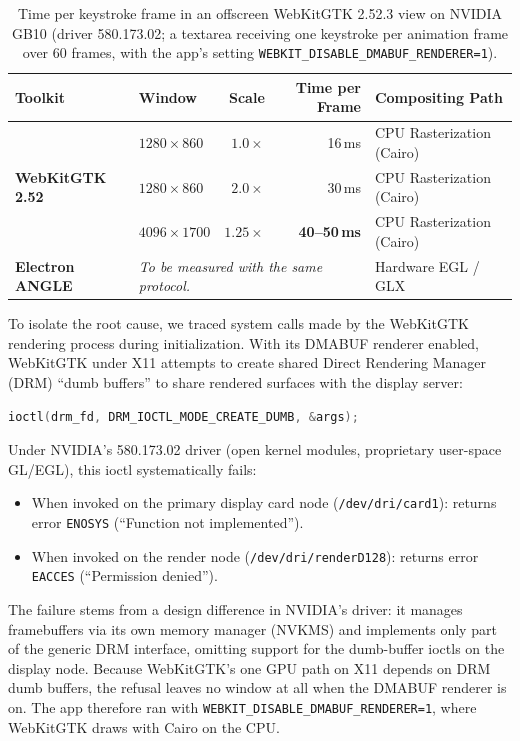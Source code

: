 \documentclass[11pt]{article}
\newcommand{\code}[1]{\texttt{#1}}
\begin{document}
\begin{table}[t]
\centering
\small
\caption{Time per keystroke frame in an offscreen WebKitGTK 2.52.3 view on NVIDIA GB10 (driver 580.173.02; a textarea
receiving one keystroke per animation frame over 60 frames, with the app's setting \code{WEBKIT\_DISABLE\_DMABUF\_RENDERER=1}).}
\label{tab:keystroke-benchmarks}
\begin{tabularx}{\linewidth}{llrrX}
\toprule
\textbf{Toolkit} & \textbf{Window} & \textbf{Scale} & \textbf{Time per Frame} & \textbf{Compositing Path} \\
\midrule
\multirow{3}{*}{\textbf{WebKitGTK 2.52}}
  & $1280 \times 860$   & $1.0\times$  & 16\,ms & CPU Rasterization (Cairo) \\
  & $1280 \times 860$   & $2.0\times$  & 30\,ms & CPU Rasterization (Cairo) \\
  & $4096 \times 1700$  & $1.25\times$ & \textbf{40--50\,ms} & CPU Rasterization (Cairo) \\
\midrule
\textbf{Electron ANGLE} & \multicolumn{3}{l}{\textit{To be measured with the same protocol.}} & Hardware EGL / GLX \\
\bottomrule
\end{tabularx}
\end{table}

To isolate the root cause, we traced system calls made by the WebKitGTK rendering process during initialization.
With its DMABUF renderer enabled, WebKitGTK under X11 attempts to create shared Direct Rendering Manager (DRM)
``dumb buffers'' to share rendered surfaces with the display server:
\begin{lstlisting}[language=c]
ioctl(drm_fd, DRM_IOCTL_MODE_CREATE_DUMB, &args);
\end{lstlisting}
Under NVIDIA's 580.173.02 driver (open kernel modules, proprietary user-space GL/EGL), this ioctl systematically fails:
\begin{itemize}
    \item When invoked on the primary display card node (\code{/dev/dri/card1}): returns error \code{ENOSYS} (``Function not implemented'').
    \item When invoked on the render node (\code{/dev/dri/renderD128}): returns error \code{EACCES} (``Permission denied'').
\end{itemize}

The failure stems from a design difference in NVIDIA's driver: it manages framebuffers via its own memory manager
(NVKMS) and implements only part of the generic DRM interface, omitting support for the dumb-buffer ioctls on the
display node. Because WebKitGTK's one GPU path on X11 depends on DRM dumb buffers, the refusal leaves no window at all
when the DMABUF renderer is on. The app therefore ran with \code{WEBKIT\_DISABLE\_DMABUF\_RENDERER=1}, where WebKitGTK
draws with Cairo on the CPU.
\end{document}
